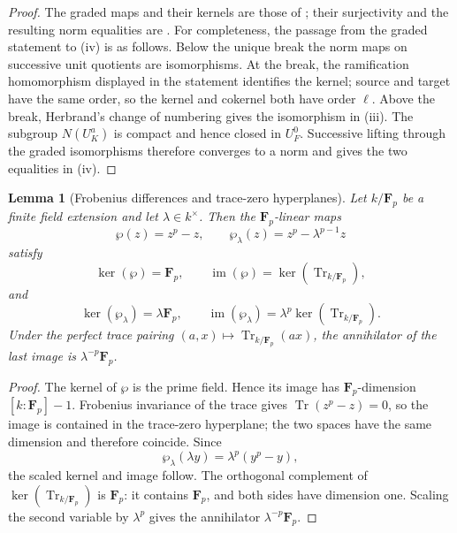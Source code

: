 \documentclass[11pt]{amsart}
\newtheorem{lemma}[theorem]{Lemma}
\theoremstyle{definition}
\theoremstyle{remark}
\newcommand{\F}{\mathbf F}
\newcommand{\Tr}{\operatorname{Tr}}
\begin{document}
\begin{proof}
The graded maps and their kernels are those of
\cite[Chapter~V, \S3, Propositions~4--5]{Serre}; their surjectivity and
the resulting norm equalities are
\cite[Chapter~V, \S3, Corollaries~1--3]{Serre}.  For completeness, the
passage from the graded statement to (iv) is as follows.  Below the unique break the norm maps on successive unit
quotients are isomorphisms.  At the break, the ramification
homomorphism displayed in the statement identifies the kernel; source
and target have the same order, so the kernel and cokernel both have
order $\ell$.  Above the break, Herbrand's change of numbering gives
the isomorphism in (iii).  The subgroup $N(U_K^a)$ is compact and hence
closed in $U_F^0$.  Successive lifting through the graded isomorphisms
therefore converges to a norm and gives the two equalities in (iv).
\end{proof}


\begin{lemma}[Frobenius differences and trace-zero hyperplanes]
\label{lem:frobenius-difference-trace}
Let $k/\F_p$ be a finite field extension and let
$\lambda\in k^\times$.  Then the $\F_p$-linear maps
\[
 \wp(z)=z^p-z,
 \qquad
 \wp_\lambda(z)=z^p-\lambda^{p-1}z
\]
satisfy
\[
 \ker(\wp)=\F_p,
 \qquad
 \operatorname{im}(\wp)=\ker\!\left(\Tr_{k/\F_p}\right),
\]
and
\begin{equation}\label{eq:scaled-frobenius-trace-image}
 \ker(\wp_\lambda)=\lambda\F_p,
 \qquad
 \operatorname{im}(\wp_\lambda)
 =\lambda^p\ker\!\left(\Tr_{k/\F_p}\right).
\end{equation}
Under the perfect trace pairing $(a,x)\mapsto\Tr_{k/\F_p}(ax)$, the
annihilator of the last image is $\lambda^{-p}\F_p$.
\end{lemma}

\begin{proof}
The kernel of $\wp$ is the prime field.  Hence its image has
$\F_p$-dimension $[k:\F_p]-1$.  Frobenius invariance of the trace gives
$\Tr(z^p-z)=0$, so the image is contained in the trace-zero hyperplane;
the two spaces have the same dimension and therefore coincide.  Since
\[
 \wp_\lambda(\lambda y)=\lambda^p(y^p-y),
\]
the scaled kernel and image follow.  The orthogonal complement of
$\ker(\Tr_{k/\F_p})$ is $\F_p$: it contains $\F_p$, and both sides have
dimension one.  Scaling the second variable by $\lambda^p$ gives the
annihilator $\lambda^{-p}\F_p$.
\end{proof}
\end{document}
